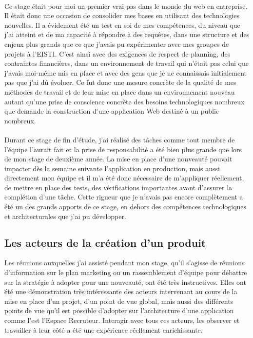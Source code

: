 \paragraph{}
Ce stage était pour moi un premier vrai pas dans le monde du web en entreprise.
Il était donc une occasion de consolider mes bases en utilisant des technologies nouvelles.
Il a évidement été un test en soi de mes compétences, du niveau que j'ai atteint et de ma capacité à répondre à des requêtes, dans une structure et des enjeux plus grands que ce que j'avais pu expérimenter avec mes groupes de projets à l'EISTI.
C'est ainsi avec des exigences de respect de planning, des contraintes financières, dans un environnement de travail qui n'était pas celui que j'avais moi-même mis en place et avec des gens que je ne connaissais initialement pas que j'ai dû évoluer.
Ce fut donc une mesure concrète de la qualité de mes méthodes de travail et de leur mise en place dans un environnement nouveau autant qu'une prise de conscience concrète des besoins technologiques nombreux que demande la construction d'une application Web destiné à un public nombreux.
\paragraph{}
Durant ce stage de fin d'étude, j'ai réalisé des tâches comme tout membre de l'équipe l'aurait fait et la prise de responsabilité a été bien plus grande que lors de mon stage de deuxième année.
La mise en place d'une nouveauté pouvait impacter dès la semaine suivante l'application en production, mais aussi directement mon équipe et il m'a été donc nécessaire de m'appliquer réellement, de mettre en place des tests, des vérifications importantes avant d'assurer la complétion d'une tâche.
Cette rigueur que je n'avais pas encore complètement a été un des grands apports de ce stage, en dehors des compétences technologiques et architecturales que j'ai pu développer.

\subsection{Les acteurs de la création d'un produit}
\label{sub:Les acteurs de la création d'un produit}
Les réunions auxquelles j'ai assisté pendant mon stage, qu'il s'agisse de réunions d'information sur le plan marketing ou un rassemblement d'équipe pour débattre sur la stratégie à adopter pour une nouveauté, ont été très instructives.
Elles ont été une démonstration très intéressante des acteurs intervenant au cours de la mise en place d'un projet, d'un point de vue global, mais aussi des différents points de vue qu'il est possible d'adopter sur l'architecture d'une application comme l'est l'Espace Recruteur.
Interagir avec tous ces acteurs, les observer et travailler à leur côté a été une expérience réellement enrichissante.

